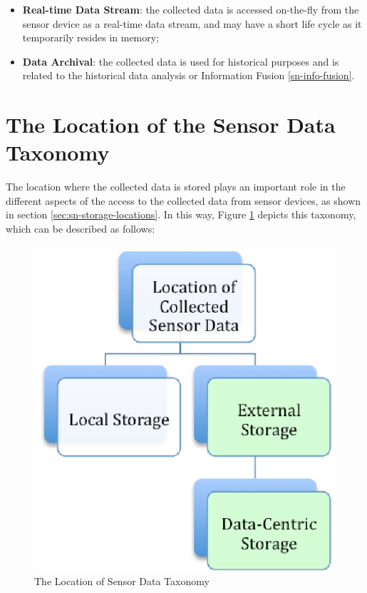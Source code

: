 \begin{itemize}
  \item \textbf{Real-time Data Stream}: the collected data is accessed
  on-the-fly from the sensor device as a real-time data stream, and may have a
  short life cycle as it temporarily resides in memory;
  \item \textbf{Data Archival}: the collected data is used for historical
  purposes and is related to the historical data analysis \cite{sn-intro01,
  sn-intro02} or Information Fusion \ref{sn-info-fusion}. 
\end{itemize}

\section{The Location of the Sensor Data Taxonomy}

The location where the collected data is stored plays an important role
in the different aspects of the access to the collected data from sensor
devices, as shown in section \ref{sec:sn-storage-locations}. In this way,
Figure \ref{fig:taxonomy-data-location} depicts this taxonomy, which can be
described as follows:

\begin{figure}[h]
  \centering
  \includegraphics{../diagrams/taxonomy-data-location}
  \caption{The Location of Sensor Data Taxonomy}
  \label{fig:taxonomy-data-location}
\end{figure}

